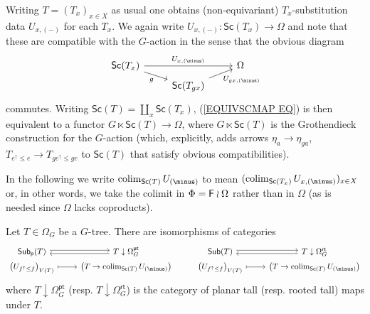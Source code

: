 \documentclass[a4paper,10pt]{article}%
\begin{document}
\begin{remark}\label{SUBSDATUMCONV REM}
%
	Writing $T = (T_x)_{x \in X}$ as usual
	one obtains (non-equivariant) $T_x$-substitution data 
	$U_{x,(\minus)}$ for each $T_x$.
	We again write
	$U_{x,(\minus)} \colon \mathsf{Sc}(T_x) \to \Omega$
	and note that these are compatible with the $G$-action in the sense that the obvious diagram
\begin{equation}\label{EQUIVSCMAP EQ}
\begin{tikzcd}[row sep =3pt]
	\mathsf{Sc}(T_x) \ar{rr}{U_{x,(\minus)}} \ar{rd}[swap]{g} &&
	\Omega
\\
	& \mathsf{Sc}(T_{gx}) \ar{ru}[swap]{U_{gx,(\minus)}}
\end{tikzcd}
\end{equation}
commutes.
Writing $\mathsf{Sc}(T) = \coprod_x \mathsf{Sc}(T_x)$,
(\ref{EQUIVSCMAP EQ}) is then equivalent to a functor
$G \ltimes \mathsf{Sc}(T) \to \Omega$,
where $G \ltimes \mathsf{Sc}(T)$ is the Grothendieck construction for the $G$-action
(which, explicitly, adds arrows 
$\eta_a \to \eta_{ga}$, 
$T_{e^{\uparrow} \leq e} \to T_{ge^{\uparrow} \leq ge}$
to $\mathsf{Sc}(T)$ that satisfy obvious compatibilities).
\end{remark}


In the following we write
$\colim_{\mathsf{Sc}(T)}U_{(\minus)}$
to mean
$(\colim_{\mathsf{Sc}(T_x)}U_{x,(\minus)})_{x \in X}$ or, in other words, we take the colimit 
in $\Phi = \mathsf{F} \wr \Omega$ rather than in $\Omega$
(as is needed since $\Omega$ lacks coproducts).


\begin{corollary}\label{SUBDATAUNDERPLANG COR}
Let $T \in \Omega_G$ be a $G$-tree. There are isomorphisms of categories
\begin{equation}\label{SUBDATAUNDERPLANG EQ}
\begin{tikzcd}[row sep =0pt]
	\mathsf{Sub}_{\mathsf{p}}(T) \ar[r,shift left=2pt] &
	T \downarrow \Omega_{G}^{\mathsf{pt}} \ar[l,shift left=2pt] &
	\mathsf{Sub}(T) \ar[r,shift left=2pt] &
	T \downarrow \Omega_{G}^{\mathsf{rt}} \ar[l,shift left=2pt]
\\
	\left(U_{f^{\uparrow} \leq f}\right)_{V(T)} \ar[r,mapsto] & 
	\left(T \to \colim_{\mathsf{Sc}(T)} U_{(\minus)}\right) &
	\left(U_{f^{\uparrow} \leq f}\right)_{V(T)} \ar[r,mapsto] & 
	\left(T \to \colim_{\mathsf{Sc}(T)} U_{(\minus)}\right)
\end{tikzcd}
\end{equation}
where $T \downarrow \Omega_G^{\mathsf{pt}}$ 
(resp. $T \downarrow \Omega_G^{\mathsf{rt}}$)
is the category of planar tall (resp. rooted tall) maps under $T$.
\end{corollary}
\end{document}
